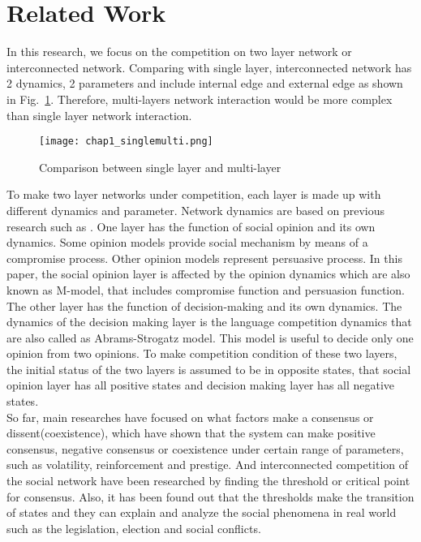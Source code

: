 \section{Related Work}
In this research, we focus on the competition on two layer network or interconnected network. Comparing with single layer, interconnected network has 2 dynamics, 2 parameters and include internal edge and external edge as shown in Fig.~\ref{chap1_singlemulti}. Therefore, multi-layers network interaction would be more complex than single layer network interaction.\\
\begin{figure}[!htb]
	\centering
	\texttt{[image: chap1\_singlemulti.png]}
	\caption{Comparison between single layer and multi-layer}
	\label{chap1_singlemulti}
\end{figure}
To make two layer networks under competition, each layer is made up with different dynamics and parameter. Network dynamics are based on previous research such as \parencite{alvarez2016}. One layer has the function of social opinion and its own dynamics. Some opinion models provide social mechanism by means of a compromise process.\parencite{naim2003} Other opinion models represent persuasive process.\parencite{chau2014} In this paper, the social opinion layer is affected by the opinion dynamics which are also known as M-model\parencite{rocca2014}, that includes compromise function and persuasion function. The other layer has the function of decision-making and its own dynamics. The dynamics of the decision making layer is the language competition dynamics that are also called as Abrams-Strogatz model\parencite{abrams2003, vazquez2010, patriarca2012}. This model is useful to decide only one opinion from two opinions. To make competition condition of these two layers, the initial status of the two layers is assumed to be in opposite states, that social opinion layer has all positive states and decision making layer has all negative states.\\
So far, main researches have focused on what factors make a consensus or dissent(coexistence), which have shown that the system can make positive consensus, negative consensus or coexistence under certain range of parameters, such as volatility, reinforcement and prestige.\parencite{alvarez2016} And interconnected competition of the social network have been researched by finding the threshold or critical point for consensus.\parencite{alvarez2016, gomez2015, diep2017} Also, it has been found out that the thresholds make the transition of states and they can explain and analyze the social phenomena in real world such as the legislation, election and social conflicts.\parencite{alvarez2016, amato2017, diep2017}\\
